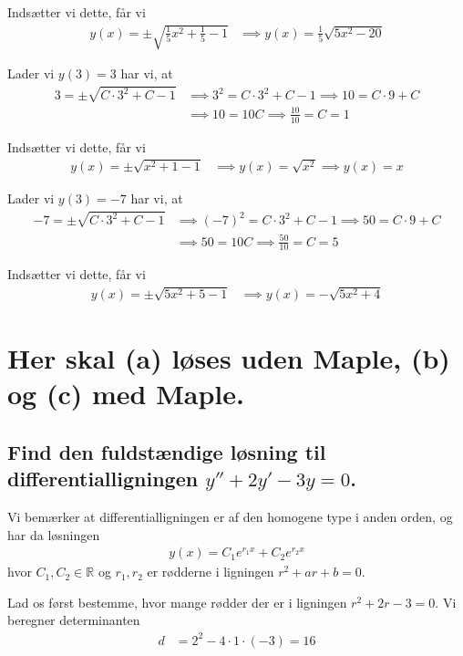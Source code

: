 \documentclass[11pt,a4paper]{article}
\begin{document}
Indsætter vi dette, får vi
\begin{align}
    y(x) = \pm \sqrt{ \frac{1}{5}x^2 + \frac{1}{5} - 1 }
    &\implies y(x) = \frac{1}{5} \sqrt{5x^2 - 20}
\end{align}

Lader vi $y(3) = 3$ har vi, at
\begin{align}
    3 = \pm \sqrt{C \cdot 3^2 + C - 1}
    &\implies 3^2 = C \cdot 3^2 + C - 1
    \implies 10 = C \cdot 9 + C \\
    &\implies 10 = 10C
     \implies \frac{10}{10} = C = 1
\end{align}

Indsætter vi dette, får vi
\begin{align}
    y(x) = \pm \sqrt{x^2 + 1 - 1}
    &\implies y(x) = \sqrt{x^2}
    \implies y(x) = x
\end{align}

Lader vi $y(3) = -7$ har vi, at
\begin{align}
    -7 = \pm \sqrt{C \cdot 3^2 + C - 1}
    &\implies (-7)^2 = C \cdot 3^2 + C - 1
    \implies 50 = C \cdot 9 + C \\
    &\implies 50 = 10C
     \implies \frac{50}{10} = C = 5
\end{align}

Indsætter vi dette, får vi
\begin{align}
    y(x) = \pm \sqrt{5x^2 + 5 - 1}
    &\implies y(x) = -\sqrt{5x^2 + 4}
\end{align}

\section
{
    \mdseries
    Her skal (a) løses uden Maple, (b) og (c) med Maple.
}

\subsection
{
    \mdseries
    Find den fuldstændige løsning til differentialligningen $y'' + 2y' -3y =
    0$.
}
Vi bemærker at differentialligningen er af den homogene type i anden orden, og
har da løsningen
\begin{align}
    y(x) = C_1 e^{r_1 x} + C_2 e^{r_2 x}
\end{align}
hvor $C_1, C_2 \in \mathbb{R}$ og $r_1, r_2$ er rødderne i ligningen $r^2 + ar
+ b = 0$.

Lad os først bestemme, hvor mange rødder der er i ligningen $r^2 + 2r - 3 =
0$. Vi beregner determinanten
\begin{align}
    d &= 2^2 - 4 \cdot 1 \cdot (-3) = 16
\end{align}
\end{document}
